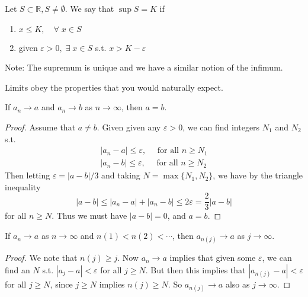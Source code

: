 \begin{definition}[Supremum]
	Let $S \subset \mathbb{R}, S \neq \emptyset$. We say that $\sup S = K$ if
	\begin{enumerate}
		\item $x \leq K,\quad \forall \; x \in S$
		\item given $\varepsilon > 0,\; \exists \; x \in S$ s.t. $x > K - \varepsilon$
	\end{enumerate} 
\end{definition} 

Note: The supremum is unique and we have a similar notion of the infimum.

Limits obey the properties that you would naturally expect.
 
\begin{lemma} \label{lem:1.1}
	If $a_n \rightarrow a$ and $a_n \rightarrow b$ as $n \rightarrow \infty$, then $a = b$.
\end{lemma}
\begin{proof}
	Assume that $a \neq b$. Given given any $\varepsilon > 0$, we can find integers $N_1$ and $N_2$ s.t.
	\begin{align*}
		|a_n - a| \leq \varepsilon, \quad \text{ for all $n \geq N_1$}\\
		|a_n - b| \leq \varepsilon, \quad \text{ for all $n \geq N_2$}
	\end{align*}
	Then letting $\varepsilon = |a - b|/3$ and taking $N = \max\{N_1, N_2\}$, we have by the triangle inequality
	$$
	|a - b| \leq |a_n - a| + |a_n - b| \leq 2\varepsilon = \frac{2}{3} |a - b|
	$$
	for all $n \geq N$.
	Thus we must have $|a - b| = 0$, and $a = b$.
\end{proof}

\begin{lemma}
	If $a_n \rightarrow a$ as $n \rightarrow \infty$ and $n(1) < n(2) < \cdots$, then $a_{n(j)} \rightarrow a$ as $j \rightarrow \infty$.
\end{lemma}
\begin{proof}
	We note that $n(j) \geq j$. Now $a_n \rightarrow a$ implies that given some $\varepsilon$, we can find an $N$ s.t. $|a_j - a| < \varepsilon$ for all $j \geq N$. But then this implies that $|a_{n(j)} - a| < \varepsilon$ for all $j \geq N$, since $j \geq N$ implies $n(j) \geq N$. So $a_{n(j)} \rightarrow a$ also as $j \to \infty$.
\end{proof}



